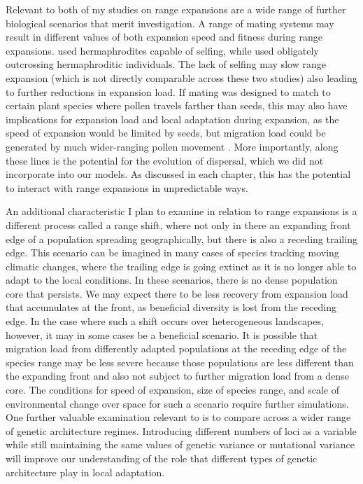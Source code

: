 Relevant to both of my studies on range expansions are a wide range of further biological scenarios that merit investigation. A range of mating systems may result in different values of both expansion speed and fitness during range expansions.  used hermaphrodites capable of selfing, while  used obligately outcrossing hermaphroditic individuals. The lack of selfing may slow range expansion (which is not directly comparable across these two studies) also leading to further reductions in expansion load. If mating was designed to match to certain plant species where pollen travels farther than seeds, this may also have implications for expansion load and local adaptation during expansion, as the speed of expansion would be limited by seeds, but migration load could be generated by much wider-ranging pollen movement \citep{Lopez:2008}. More importantly, along these lines is the potential for the evolution of dispersal, which we did not incorporate into our models. As discussed in each chapter, this has the potential to interact with range expansions in unpredictable ways.

An additional characteristic I plan to examine in relation to range expansions is a different process called a range shift, where not only in there an expanding front edge of a population spreading geographically, but there is also a receding trailing edge. This scenario can be imagined in many cases of species tracking moving climatic changes, where the trailing edge is going extinct as it is no longer able to adapt to the local conditions. In these scenarios, there is no dense population core that persists. We may expect there to be less recovery from expansion load that accumulates at the front, as beneficial diversity is lost from the receding edge. In the case where such a shift occurs over heterogeneous landscapes, however, it may in some cases be a beneficial scenario. It is possible that migration load from differently adapted populations at the receding edge of the species range may be less severe because those populations are less different than the expanding front and also not subject to further migration load from a dense core. The conditions for speed of expansion, size of species range, and scale of environmental change over space for such a scenario require further simulations. One further valuable examination relevant to  is to compare across a wider range of genetic architecture regimes. Introducing different numbers of loci as a variable while still maintaining the same values of genetic variance or mutational variance will improve our understanding of the role that different types of genetic architecture play in local adaptation.

